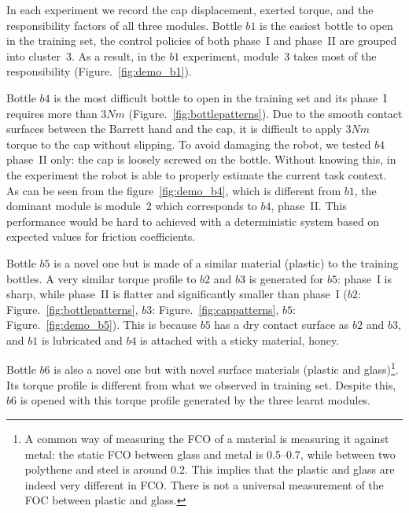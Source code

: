 In each experiment we record the cap displacement, exerted torque, and
the responsibility factors of all three modules. Bottle $b1$ is the
easiest bottle to open in the training set, the control policies of
both phase~I and phase~II are grouped into cluster~3. As a result,
in the $b1$ experiment, module~3 takes most of the responsibility
(Figure.~\ref{fig:demo_b1}).

Bottle $b4$ is the most difficult bottle to open in the training set
and its phase~I requires more than $3Nm$
(Figure.~\ref{fig:bottlepatterns}). Due to the smooth contact surfaces
between the Barrett hand and the cap, it is difficult to apply $3Nm$
torque to the cap without slipping. To avoid damaging the robot, we
tested $b4$ phase~II only: the cap is loosely screwed on the
bottle. Without knowing this, in the experiment the robot is able to
properly estimate the current task context. As can be seen from the
figure~\ref{fig:demo_b4}, which is different from $b1$, the dominant
module is module~2 which corresponds to  $b4$, phase~II. This
performance would be hard to achieved with a deterministic system based
on expected values for friction coefficients.

Bottle $b5$ is a novel one but is made of a similar material (plastic) to
the training bottles. A very similar torque profile to $b2$ and $b3$ is
generated for $b5$: phase~I is sharp, while phase~II is flatter and
significantly smaller than phase~I ($b2$:
Figure.~\ref{fig:bottlepatterns}, $b3$: Figure.~\ref{fig:cappatterns},
$b5$: Figure.~\ref{fig:demo_b5}). This is because $b5$ has a dry contact
surface as $b2$ and $b3$, and $b1$ is lubricated and $b4$ is attached with
a sticky material, honey.

Bottle $b6$ is also a novel one but with novel surface materials
(plastic and glass)\footnote{A common way of measuring the FCO of a
  material is measuring it against metal: the static FCO between glass
  and metal is 0.5--0.7, while between two polythene and steel is
  around 0.2. This implies that the plastic and glass are indeed very
  different in FCO. There is not a universal measurement of the FOC
  between plastic and glass.}. Its torque profile is different from
what we observed in training set. Despite this, $b6$ is opened with this
torque profile generated by the three learnt modules.


